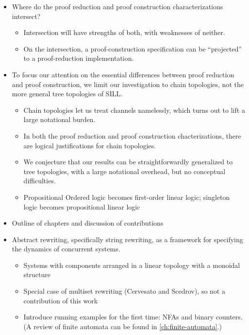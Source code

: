 \begin{itemize}
\item
  Where do the proof reduction and proof construction characterizations intersect?
  \begin{itemize}[nosep]
  \item Intersection will have strengths of both, with weaknesses of neither.
  \item On the intersection, a proof-construction specification can be \enquote{projected} to a proof-reduction implementation.
  \end{itemize}

\item
  To focus our attention on the essential differences between proof reduction and proof construction, we limit our investigation to chain topologies, not the more general tree topologies of SILL.
  \begin{itemize}[nosep]
  \item Chain topologies let us treat channels namelessly, which turns out to lift a large notational burden.
  \item In both the proof reduction and proof construction chacterizations, there are logical justifications for chain topologies.
  \item We conjecture that our results can be straightforwardly generalized to tree topologies, with a large notational overhead, but no conceptual difficulties.
  \item Propositional Ordered logic becomes first-order linear logic; singleton logic becomes propositional linear logic
  \end{itemize}

\item
  Outline of chapters and discussion of contributions

\item
  Abstract rewriting, specifically string rewriting, as a framework for specifying the dynamics of concurrent systems.
  \begin{itemize}[nosep]
  \item Systems with components arranged in a linear topology with a monoidal structure 
  \item Special case of multiset rewriting (Cervesato and Scedrov), so not a contribution of this work
  \item Introduce running examples for the first time: NFAs and binary counters.
    (A review of finite automata can be found in \cref{ch:finite-automata}.)
  \end{itemize}


\end{itemize}
